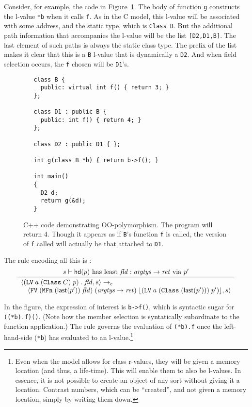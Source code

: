 \documentclass[11pt]{article}
\begin{document}
Consider, for example, the code in Figure~\ref{fig:oo-example}.  The
body of function \texttt{g} constructs the l-value \texttt{*b} when it
calls \texttt{f}.  As in the C model, this l-value will be associated
with some address, and the static type, which is \texttt{Class~B}.
But the additional path information that accompanies the l-value will
be the list \texttt{[D2,D1,B]}.  The last element of such paths is always
the static class type.  The prefix of the list makes it clear that
this is a \texttt{B} l-value that is dynamically a \texttt{D2}.  And
when field selection occurs, the \texttt{f} chosen will be
\texttt{D1}'s.

\begin{figure}[hbtp]
\begin{verbatim}
   class B {
     public: virtual int f() { return 3; }
   };

   class D1 : public B {
     public: int f() { return 4; }
   };

   class D2 : public D1 { };

   int g(class B *b) { return b->f(); }

   int main()
   {
     D2 d;
     return g(&d);
   }
\end{verbatim}
\caption{C++ code demonstrating OO-polymorphism.  The program will
  return 4. Though it appears as if \texttt{B}'s function \texttt{f}
  is called, the version of \texttt{f} called will actually be that
  attached to \texttt{D1}.}
\label{fig:oo-example}
\end{figure}

The rule encoding all this is :
\[
\infer{\begin{array}{l}
    \statebrack{(\clvalue\;a\;(\texttt{Class}\;C)\;p)\;\mathbf{.}\;
      \mathit{fld},s} \exprarrow \\
    \quad\statebrack{\cfvalue\;(\texttt{MFn}\;(\last(p'))\;\mathit{fld})\;
  (\funtype{\mathit{argtys}}{\mathit{ret}})\;
  \SOME{(\clvalue\;a\;(\texttt{Class}\;(\last(p')))\;p')},s}\end{array}}{
s \vdash \hd(p) \textrm{ has least } \mathit{fld} :
  \funtype{\mathit{argtys}}{\mathit{ret}} \textrm{ via } p'}
\]

In the figure, the expression of interest is \texttt{b->f()}, which is
syntactic sugar for \texttt{((*b).f)()}.  (Note how the member
selection is syntatically subordinate to the function application.)
The  rule governs the evaluation of
\texttt{(*b).f} once the left-hand-side (\texttt{*b}) has evaluated to
an l-value.\footnote{Even when the model allows for class r-values,
  they will be given a memory location (and thus, a life-time).  This
  will enable them to also be l-values.  In essence, it is not
  possible to create an object of any sort without giving it a
  location.  Contrast numbers, which can be ``created'', and not given
  a memory location, simply by writing them down.}
\end{document}
